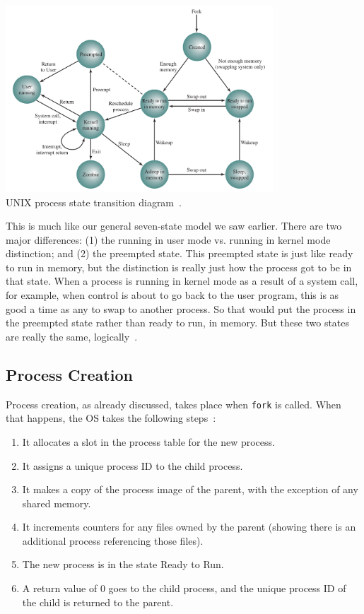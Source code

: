 \begin{center}
\includegraphics[width=0.75\textwidth]{images/unix-states.png}\\
UNIX process state transition diagram~\cite{osi}.
\end{center}

This is much like our general seven-state model we saw earlier. There are two major differences: (1) the running in user mode vs. running in kernel mode distinction; and (2) the preempted state. This preempted state is just like ready to run in memory, but the distinction is really just how the process got to be in that state. When a process is running in kernel mode as a result of a system call, for example, when control is about to go back to the user program, this is as good a time as any to swap to another process. So that would put the process in the preempted state rather than ready to run, in memory. But these two states are really the same, logically~\cite{osi}. 

\subsection*{Process Creation}
Process creation, as already discussed, takes place when \texttt{fork} is called. When that happens, the OS takes the following steps~\cite{bach86}:

\begin{enumerate}
	\item It allocates a slot in the process table for the new process.
	\item It assigns a unique process ID to the child process.
	\item It makes a copy of the process image of the parent, with the exception of any shared memory.
	\item It increments counters for any files owned by the parent (showing there is an additional process referencing those files).
	\item The new process is in the state Ready to Run.
	\item A return value of 0 goes to the child process, and the unique process ID of the child is returned to the parent.
\end{enumerate}


